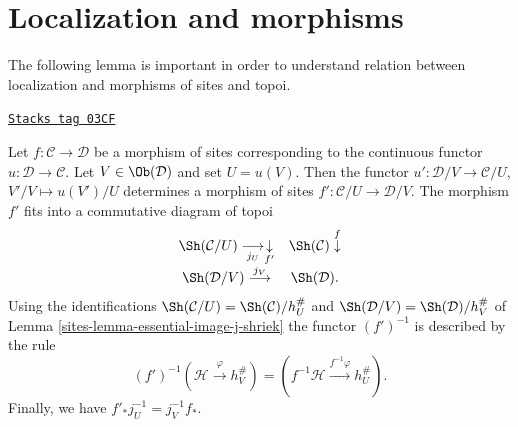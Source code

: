 \section{Localization and morphisms}
\label{sites-section-localize-morphisms}
The following lemma is important in order to understand relation
between localization and morphisms of sites and topoi.

\begin{lemma}
\label{sites-lemma-localize-morphism}
\href{https://stacks.math.columbia.edu/tag/03CF}{\texttt{Stacks tag 03CF}}

Let $f : \mathcal{C} \to \mathcal{D}$ be a morphism of sites
corresponding to the continuous functor $u : \mathcal{D} \to \mathcal{C}$.
Let $V \in \Ob(\mathcal{D})$ and set $U = u(V)$.
Then the functor $u' : \mathcal{D}/V \to \mathcal{C}/U$,
$V'/V \mapsto u(V')/U$ determines a morphism of sites
$f' : \mathcal{C}/U \to \mathcal{D}/V$.
The morphism $f'$ fits into a commutative diagram of topoi
$$
\begin{array}{cc}\Sh(\mathcal{C}/U) \underset{j_U}{\longrightarrow}\underset{f'}{\downarrow} & \Sh(\mathcal{C}) \overset{f}{\downarrow} \\ \Sh(\mathcal{D}/V) \overset{j_V}{\longrightarrow} & \Sh(\mathcal{D}).\end{array}
$$
Using the identifications
$\Sh(\mathcal{C}/U) = \Sh(\mathcal{C})/h_U^\#$ and
$\Sh(\mathcal{D}/V) = \Sh(\mathcal{D})/h_V^\#$ of
Lemma \ref{sites-lemma-essential-image-j-shriek}
the functor $(f')^{-1}$ is described by the rule
$$
(f')^{-1}(\mathcal{H} \xrightarrow{\varphi} h_V^\#)
=
(f^{-1}\mathcal{H} \xrightarrow{f^{-1}\varphi} h_U^\#).
$$
Finally, we have $f'_*j_U^{-1} = j_V^{-1}f_*$.
\end{lemma}

